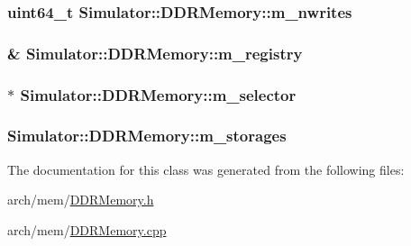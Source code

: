 \hypertarget{class_simulator_1_1_d_d_r_memory_a0b1446411da9a506ad43e5622152ab3f}{
\subsubsection[{m\+\_\+nwrites}]{\setlength{\rightskip}{0pt plus 5cm}uint64\+\_\+t Simulator\+::\+D\+D\+R\+Memory\+::m\+\_\+nwrites\hspace{0.3cm}{\ttfamily [protected]}}}\label{class_simulator_1_1_d_d_r_memory_a0b1446411da9a506ad43e5622152ab3f}
\hypertarget{class_simulator_1_1_d_d_r_memory_a5c7ae6a98783750acfd99f473475d290}{
\subsubsection[{m\+\_\+registry}]{\& Simulator\+::\+D\+D\+R\+Memory\+::m\+\_\+registry\hspace{0.3cm}{\ttfamily [protected]}}}\label{class_simulator_1_1_d_d_r_memory_a5c7ae6a98783750acfd99f473475d290}
\hypertarget{class_simulator_1_1_d_d_r_memory_ac9641b0d58bc819ae98172e599a4753e}{
\subsubsection[{m\+\_\+selector}]{$\ast$ Simulator\+::\+D\+D\+R\+Memory\+::m\+\_\+selector\hspace{0.3cm}{\ttfamily [protected]}}}\label{class_simulator_1_1_d_d_r_memory_ac9641b0d58bc819ae98172e599a4753e}
\hypertarget{class_simulator_1_1_d_d_r_memory_a978f278bcf563c6b0ff18d5da028d542}{
\subsubsection[{m\+\_\+storages}]{ Simulator\+::\+D\+D\+R\+Memory\+::m\+\_\+storages\hspace{0.3cm}{\ttfamily [protected]}}}\label{class_simulator_1_1_d_d_r_memory_a978f278bcf563c6b0ff18d5da028d542}


The documentation for this class was generated from the following files\+:\begin{DoxyCompactItemize}
\item 
arch/mem/\hyperlink{_d_d_r_memory_8h}{D\+D\+R\+Memory.\+h}\item 
arch/mem/\hyperlink{_d_d_r_memory_8cpp}{D\+D\+R\+Memory.\+cpp}\end{DoxyCompactItemize}
